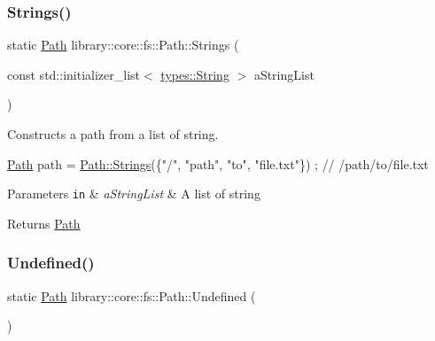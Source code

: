 \subsubsection{\texorpdfstring{Strings()}{Strings()}}
{\footnotesize\ttfamily static \hyperlink{classlibrary_1_1core_1_1fs_1_1Path}{Path} library\+::core\+::fs\+::\+Path\+::\+Strings (\begin{DoxyParamCaption}\item[{const std\+::initializer\+\_\+list$<$ \hyperlink{classlibrary_1_1core_1_1types_1_1String}{types\+::\+String} $>$}]{a\+String\+List }\end{DoxyParamCaption})\hspace{0.3cm}{\ttfamily [static]}}



Constructs a path from a list of string. 


\begin{DoxyCode}
\hyperlink{classlibrary_1_1core_1_1fs_1_1Path_aaba9a8e0153813f08f78f1c3275734a4}{Path} path = \hyperlink{classlibrary_1_1core_1_1fs_1_1Path_a8b5672cb98f78457824137454065897c}{Path::Strings}(\{\textcolor{stringliteral}{"/"}, \textcolor{stringliteral}{"path"}, \textcolor{stringliteral}{"to"}, \textcolor{stringliteral}{"file.txt"}\}) ; \textcolor{comment}{// /path/to/file.txt}
\end{DoxyCode}



\begin{DoxyParams}[1]{Parameters}
\mbox{\tt in}  & {\em a\+String\+List} & A list of string \\
\hline
\end{DoxyParams}
\begin{DoxyReturn}{Returns}
\hyperlink{classlibrary_1_1core_1_1fs_1_1Path}{Path} 
\end{DoxyReturn}
\mbox{\label{classlibrary_1_1core_1_1fs_1_1Path_a89cddd92be70121f2537726d69ca6499}} 
\subsubsection{\texorpdfstring{Undefined()}{Undefined()}}
{\footnotesize\ttfamily static \hyperlink{classlibrary_1_1core_1_1fs_1_1Path}{Path} library\+::core\+::fs\+::\+Path\+::\+Undefined (\begin{DoxyParamCaption}{ }\end{DoxyParamCaption})\hspace{0.3cm}{\ttfamily [static]}}



